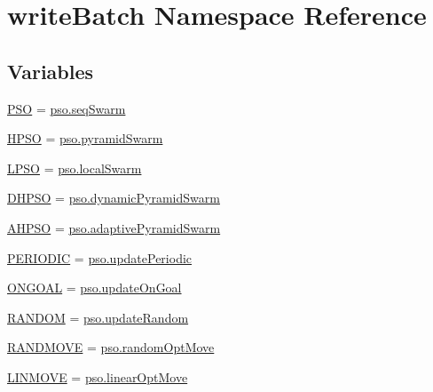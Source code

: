 \hypertarget{namespacewriteBatch}{
\section{writeBatch Namespace Reference}
\label{namespacewriteBatch}
}


\subsection*{Variables}
\begin{CompactItemize}
\item 
\hyperlink{namespacewriteBatch_09a690c62b5c4410937815d42e903ac1}{PSO} = \hyperlink{namespacepso_958a3bcd6a80cc329bf7ee6ee063e7b9}{pso.seqSwarm}
\item 
\hyperlink{namespacewriteBatch_5b44964b8393adb2e89c072664877384}{HPSO} = \hyperlink{namespacepso_dba1f2308456aa3d671f0d8688d0c978}{pso.pyramidSwarm}
\item 
\hyperlink{namespacewriteBatch_8a6a0050889d3943334cf739624a543d}{LPSO} = \hyperlink{namespacepso_9c6cdfe6aa5b7d0deb85d49088627ff2}{pso.localSwarm}
\item 
\hyperlink{namespacewriteBatch_b4f9d2747f950e8ee069341ecd613cec}{DHPSO} = \hyperlink{namespacepso_94cf4a6b28e68d35bb6a50e03556baa7}{pso.dynamicPyramidSwarm}
\item 
\hyperlink{namespacewriteBatch_e18b9d53c68a25d13173a7a5b2d89806}{AHPSO} = \hyperlink{namespacepso_77cce1553104d7778e5e362d0cb63ec3}{pso.adaptivePyramidSwarm}
\item 
\hyperlink{namespacewriteBatch_e0121164fd219dbdfca08e9cf8144e45}{PERIODIC} = \hyperlink{namespacepso_8f17d13a72a14e5dcca6538e168f02ba}{pso.updatePeriodic}
\item 
\hyperlink{namespacewriteBatch_f9015cee23e486aabc13db513bb2d321}{ONGOAL} = \hyperlink{namespacepso_c375f7d831876487d7c2ab48a6ee9350}{pso.updateOnGoal}
\item 
\hyperlink{namespacewriteBatch_2c15bfd8485201aa5de8c3ce4b1a67bb}{RANDOM} = \hyperlink{namespacepso_311496d719ef15ca20374f9c91c7a812}{pso.updateRandom}
\item 
\hyperlink{namespacewriteBatch_fcdbc0eb5cf6ff63f1b25ca6671cc451}{RANDMOVE} = \hyperlink{namespacepso_d0243c5ff75f80c10e305455eef942ec}{pso.randomOptMove}
\item 
\hyperlink{namespacewriteBatch_0b34981055c0c12499748c83dc471f71}{LINMOVE} = \hyperlink{namespacepso_30a965488f96d12d3344efafe39fb77e}{pso.linearOptMove}
\item 

\end{CompactItemize}
